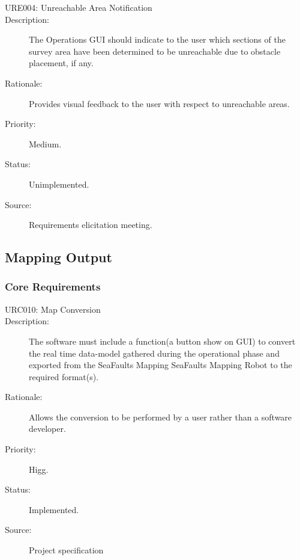 \documentclass[12pt]{article}
\begin{document}
\begin{description}
\item [{URE004: Unreachable Area Notification}\label{URE004}] \item [{Description: }\label{Description}] The Operations GUI should indicate to the user which sections of the survey area have been determined to be unreachable due to obstacle placement, if any.
\item[{Rationale: }\label{Rationale}] Provides visual feedback to the user with respect to unreachable areas.
\item[{Priority: }\label{Priority}] Medium.
\item[{Status: }\label{Status}] Unimplemented.
\item[{Source: }\label{Source}] Requirements elicitation meeting.

\end{description}

\subsection{Mapping Output}

\subsubsection{Core Requirements}
\begin{description}
\item [{URC010: Map Conversion}\label{URC010}] 
\item [{Description: }\label{Description}] The software must include a function(a button show on GUI) to convert the real time data-model gathered during the operational phase and exported from the SeaFaults Mapping SeaFaults Mapping Robot to the required format(s).
\item[{Rationale: }\label{Rationale}] Allows the conversion to be performed by a user rather than a software developer.
\item[{Priority: }\label{Priority}] Higg.
\item[{Status: }\label{Status}] Implemented.
\item[{Source: }\label{Source}] Project specification \cite{spec}

\end{description}
\end{document}
